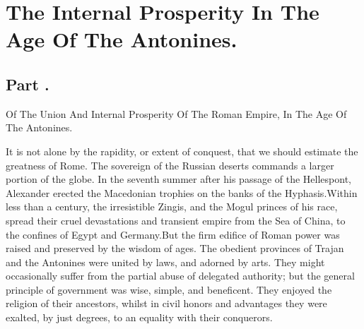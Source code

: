 \chapter{The Internal Prosperity In The Age Of The Antonines.}
\section{Part \thesection.}

Of The Union And Internal Prosperity Of The Roman Empire, In The
Age Of The Antonines.
\vspace{\onelineskip}

It is not alone by the rapidity, or extent of conquest, that we
should estimate the greatness of Rome. The sovereign of the
Russian deserts commands a larger portion of the globe. In the
seventh summer after his passage of the Hellespont, Alexander
erected the Macedonian trophies on the banks of the Hyphasis.\footnotemark[1]
Within less than a century, the irresistible Zingis, and the
Mogul princes of his race, spread their cruel devastations and
transient empire from the Sea of China, to the confines of Egypt
and Germany.\footnotemark[2] But the firm edifice of Roman power was raised and
preserved by the wisdom of ages. The obedient provinces of Trajan
and the Antonines were united by laws, and adorned by arts. They
might occasionally suffer from the partial abuse of delegated
authority; but the general principle of government was wise,
simple, and beneficent. They enjoyed the religion of their
ancestors, whilst in civil honors and advantages they were
exalted, by just degrees, to an equality with their conquerors.


